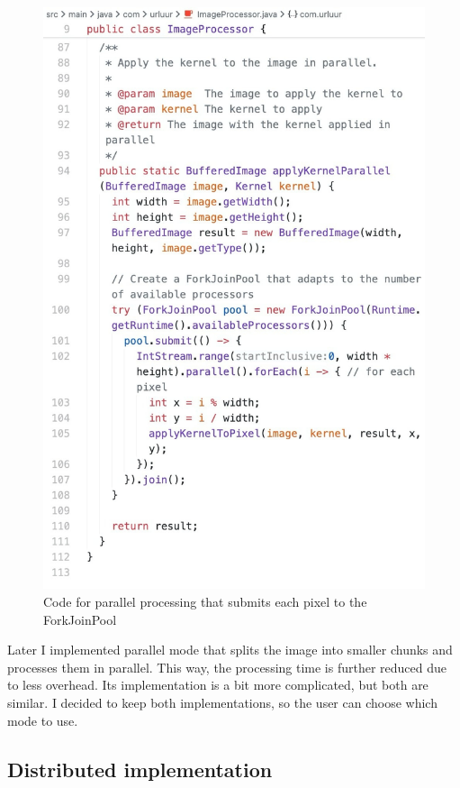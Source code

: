 \documentclass{article}
\begin{document}
\begin{multicols}{2}
    \begin{figure}[H]
        \centering
        \includegraphics[width=\linewidth]{img/parallel.jpg}
        \caption{Code for parallel processing that submits each pixel to the ForkJoinPool}
        \label{fig:parallelcode}
    \end{figure}

    Later I implemented parallel mode that splits the image into smaller chunks and processes them in parallel. This way, the processing time is further reduced due to less overhead. Its implementation is a bit more complicated, but both are similar. I decided to keep both implementations, so the user can choose which mode to use.

    \subsection{Distributed implementation}


\end{multicols}
\end{document}
